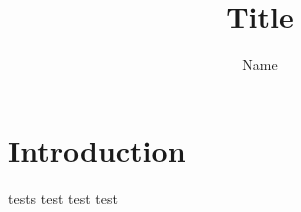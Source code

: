 \documentclass{article}
\title{Title}
\author{Name}
\begin{document}
\maketitle

\section{Introduction}
tests
test
test
test
\end{document}
